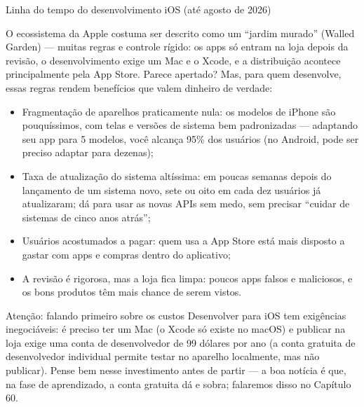 \begin{center}\small\color{gray}Linha do tempo do desenvolvimento iOS (até agosto de 2026)\end{center}


O ecossistema da Apple costuma ser descrito como um “jardim murado” (Walled Garden) — muitas regras e controle rígido: os apps só entram na loja depois da revisão, o desenvolvimento exige um Mac e o Xcode, e a distribuição acontece principalmente pela App Store. Parece apertado? Mas, para quem desenvolve, essas regras rendem benefícios que valem dinheiro de verdade:

\begin{itemize}
  \item Fragmentação de aparelhos praticamente nula: os modelos de iPhone são pouquíssimos, com telas e versões de sistema bem padronizadas — adaptando seu app para 5 modelos, você alcança 95\% dos usuários (no Android, pode ser preciso adaptar para dezenas);
  \item Taxa de atualização do sistema altíssima: em poucas semanas depois do lançamento de um sistema novo, sete ou oito em cada dez usuários já atualizaram; dá para usar as novas APIs sem medo, sem precisar “cuidar de sistemas de cinco anos atrás”;
  \item Usuários acostumados a pagar: quem usa a App Store está mais disposto a gastar com apps e compras dentro do aplicativo;
  \item A revisão é rigorosa, mas a loja fica limpa: poucos apps falsos e maliciosos, e os bons produtos têm mais chance de serem vistos.
\end{itemize}

\begin{tcbwarn}{Atenção: falando primeiro sobre os custos}
Desenvolver para iOS tem exigências inegociáveis: é preciso ter um Mac (o Xcode só existe no macOS) e publicar na loja exige uma conta de desenvolvedor de 99 dólares por ano (a conta gratuita de desenvolvedor individual permite testar no aparelho localmente, mas não publicar). Pense bem nesse investimento antes de partir — a boa notícia é que, na fase de aprendizado, a conta gratuita dá e sobra; falaremos disso no Capítulo 60.

\end{tcbwarn}


